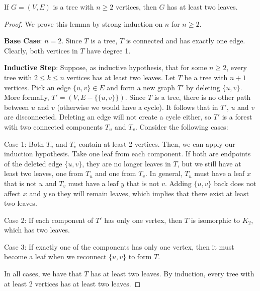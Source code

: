\begin{lemma}
    If $G = (V,E)$ is a tree with $n \geq 2$ vertices, then $G$ has at least two leaves.
\end{lemma}

\begin{proof}
    We prove this lemma by strong induction on $n$ for $n \geq 2$.

    \textbf{Base Case}: $n = 2$. Since $T$ is a tree, $T$ is connected and has exactly one edge. Clearly, both vertices in $T$ have degree 1.

    \textbf{Inductive Step}: Suppose, as inductive hypothesis, that for some $n \geq 2$, every tree with $2 \leq k \leq n$ vertices has at least two leaves. Let $T$ be a tree with $n+1$ vertices. Pick an edge $\{u,v\} \in E$ and form a new graph $T'$ by deleting $\{u,v\}$. More formally, $T' = (V, E - \{\{u,v\}\})$. Since $T$ is a tree, there is no other path between $u$ and $v$ (otherwise we would have a cycle). It follows that in $T'$, $u$ and $v$ are disconnected. Deleting an edge will not create a cycle either, so $T'$ is a forest with two connected components $T_u$ and $T_v$. Consider the following cases:

    Case 1: Both $T_u$ and $T_v$ contain at least 2 vertices. Then, we can apply our induction hypothesis. Take one leaf from each component. If both are endpoints of the deleted edge $\{u,v\}$, they are no longer leaves in $T$, but we still have at least two leaves, one from $T_u$ and one from $T_v$. In general, $T_u$ must have a leaf $x$ that is not $u$ and $T_v$ must have a leaf $y$ that is not $v$. Adding $\{u,v\}$ back does not affect $x$ and $y$ so they will remain leaves, which implies that there exist at least two leaves.
    
    Case 2: If each component of $T'$ has only one vertex, then $T$ is isomorphic to $K_2$, which has two leaves.
    
    Case 3: If exactly one of the components has only one vertex, then it must become a leaf when we reconnect $\{u,v\}$ to form $T$.

    In all cases, we have that $T$ has at least two leaves. By induction, every tree with at least 2 vertices has at least two leaves.
\end{proof}

